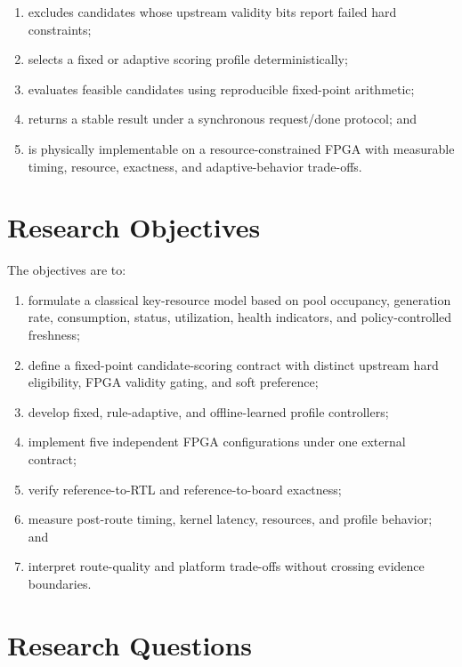 \begin{enumerate}
  \item excludes candidates whose upstream validity bits report failed hard
  constraints;
  \item selects a fixed or adaptive scoring profile deterministically;
  \item evaluates feasible candidates using reproducible fixed-point arithmetic;
  \item returns a stable result under a synchronous request/done protocol; and
  \item is physically implementable on a resource-constrained FPGA with measurable
  timing, resource, exactness, and adaptive-behavior trade-offs.
\end{enumerate}

\section{Research Objectives}

The objectives are to:

\begin{enumerate}
  \item formulate a classical key-resource model based on pool occupancy,
  generation rate, consumption, status, utilization, health indicators, and
  policy-controlled freshness;
  \item define a fixed-point candidate-scoring contract with distinct upstream hard
  eligibility, FPGA validity gating, and soft preference;
  \item develop fixed, rule-adaptive, and offline-learned profile controllers;
  \item implement five independent FPGA configurations under one external contract;
  \item verify reference-to-RTL and reference-to-board exactness;
  \item measure post-route timing, kernel latency, resources, and profile behavior;
  and
  \item interpret route-quality and platform trade-offs without crossing evidence
  boundaries.
\end{enumerate}

\section{Research Questions}

